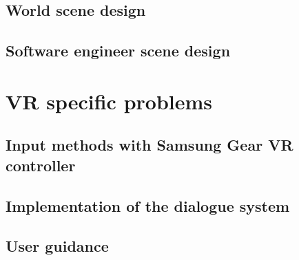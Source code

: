 \subsection{World scene design}

\subsection{Software engineer scene design}
\section{VR specific problems}
\subsection{Input methods with Samsung Gear VR controller} \label{inputmethods}
\subsection{Implementation of the dialogue system}
\subsection{User guidance}